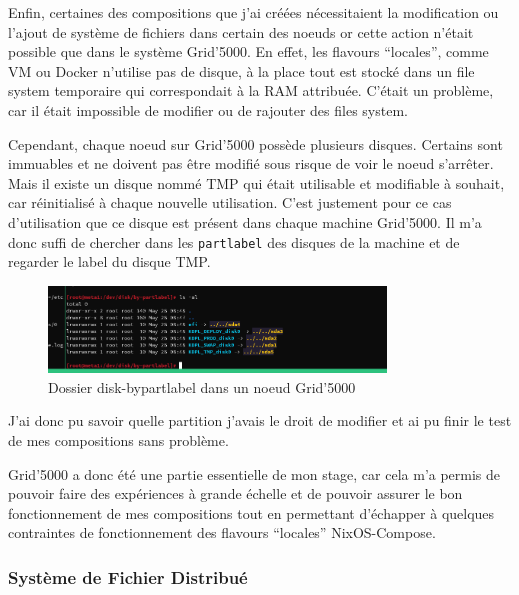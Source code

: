 \documentclass[a4paper,french,12pt, titlepage]{article}
\begin{document}
Enfin, certaines des compositions que j'ai créées nécessitaient la
modification ou l'ajout de système de fichiers dans certain des noeuds
or cette action n'était possible que dans le système Grid'5000. En
effet, les flavours ``locales'', comme VM ou Docker n'utilise pas de
disque, à la place tout est stocké dans un file system temporaire qui
correspondait à la RAM attribuée. C'était un problème, car il était
impossible de modifier ou de rajouter des files system.

Cependant, chaque noeud sur Grid'5000 possède plusieurs disques.
Certains sont immuables et ne doivent pas être modifié sous risque de
voir le noeud s'arrêter. Mais il existe un disque nommé TMP qui était
utilisable et modifiable à souhait, car réinitialisé à chaque nouvelle
utilisation. C'est justement pour ce cas d'utilisation que ce disque est
présent dans chaque machine Grid'5000. Il m'a donc suffi de chercher
dans les \texttt{partlabel} des disques de la machine et de regarder le
label du disque TMP.\newline

\begin{figure}[h]
\centering
\includegraphics[width=0.8\textwidth,height=0.8\textheight,keepaspectratio]{annexe/disk_g5k.png}
\caption{Dossier disk-bypartlabel dans un noeud Grid'5000}
\end{figure}

J'ai donc pu savoir quelle partition j'avais le droit de modifier et ai
pu finir le test de mes compositions sans problème.\newline

Grid'5000 a donc été une partie essentielle de mon stage, car cela m'a
permis de pouvoir faire des expériences à grande échelle et de pouvoir
assurer le bon fonctionnement de mes compositions tout en permettant
d'échapper à quelques contraintes de fonctionnement des flavours
``locales'' NixOS-Compose.\newline

\hypertarget{systuxe8me-de-fichier-distribuuxe9}{%
\subsubsection{Système de Fichier
Distribué}\label{systuxe8me-de-fichier-distribuuxe9}}
\end{document}
